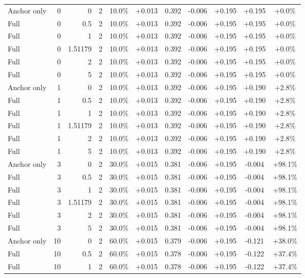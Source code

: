 \begin{table}[htbp]
\begin{tabular}{lrrrccccccc}
Anchor only & 0 & 0 & 2 & 10.0\% & +0.013 & 0.392 & -0.006 & +0.195 & +0.195 & +0.0\% \\
Full & 0 & 0.5 & 2 & 10.0\% & +0.013 & 0.392 & -0.006 & +0.195 & +0.195 & +0.0\% \\
Full & 0 & 1 & 2 & 10.0\% & +0.013 & 0.392 & -0.006 & +0.195 & +0.195 & +0.0\% \\
Full & 0 & 1.51179 & 2 & 10.0\% & +0.013 & 0.392 & -0.006 & +0.195 & +0.195 & +0.0\% \\
Full & 0 & 2 & 2 & 10.0\% & +0.013 & 0.392 & -0.006 & +0.195 & +0.195 & +0.0\% \\
Full & 0 & 5 & 2 & 10.0\% & +0.013 & 0.392 & -0.006 & +0.195 & +0.195 & +0.0\% \\
Anchor only & 1 & 0 & 2 & 10.0\% & +0.013 & 0.392 & -0.006 & +0.195 & +0.190 & +2.8\% \\
Full & 1 & 0.5 & 2 & 10.0\% & +0.013 & 0.392 & -0.006 & +0.195 & +0.190 & +2.8\% \\
Full & 1 & 1 & 2 & 10.0\% & +0.013 & 0.392 & -0.006 & +0.195 & +0.190 & +2.8\% \\
Full & 1 & 1.51179 & 2 & 10.0\% & +0.013 & 0.392 & -0.006 & +0.195 & +0.190 & +2.8\% \\
Full & 1 & 2 & 2 & 10.0\% & +0.013 & 0.392 & -0.006 & +0.195 & +0.190 & +2.8\% \\
Full & 1 & 5 & 2 & 10.0\% & +0.013 & 0.392 & -0.006 & +0.195 & +0.190 & +2.8\% \\
Anchor only & 3 & 0 & 2 & 30.0\% & +0.015 & 0.381 & -0.006 & +0.195 & -0.004 & +98.1\% \\
Full & 3 & 0.5 & 2 & 30.0\% & +0.015 & 0.381 & -0.006 & +0.195 & -0.004 & +98.1\% \\
Full & 3 & 1 & 2 & 30.0\% & +0.015 & 0.381 & -0.006 & +0.195 & -0.004 & +98.1\% \\
Full & 3 & 1.51179 & 2 & 30.0\% & +0.015 & 0.381 & -0.006 & +0.195 & -0.004 & +98.1\% \\
Full & 3 & 2 & 2 & 30.0\% & +0.015 & 0.381 & -0.006 & +0.195 & -0.004 & +98.1\% \\
Full & 3 & 5 & 2 & 30.0\% & +0.015 & 0.381 & -0.006 & +0.195 & -0.004 & +98.1\% \\
Anchor only & 10 & 0 & 2 & 60.0\% & +0.015 & 0.379 & -0.006 & +0.195 & -0.121 & +38.0\% \\
Full & 10 & 0.5 & 2 & 60.0\% & +0.015 & 0.378 & -0.006 & +0.195 & -0.122 & +37.4\% \\
Full & 10 & 1 & 2 & 60.0\% & +0.015 & 0.378 & -0.006 & +0.195 & -0.122 & +37.4\% \\

\end{tabular}
\end{table}
